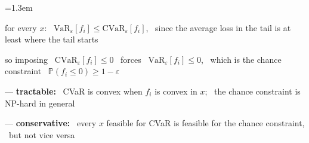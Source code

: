 \documentclass[10pt]{article}
\newenvironment{board}{%
  \par\vspace{4pt}
  \begingroup\leftskip=1.3em\relax\parskip=2pt\relax}{%
  \par\endgroup\vspace{4pt}}
\newcommand{\Prob}{\mathbb{P}}
\newcommand{\VaR}{\mathrm{VaR}}
\newcommand{\CVaR}{\mathrm{CVaR}}
\begin{document}
\begin{board}
\begin{center}
\end{center}
\vspace{2pt}

\quad for every $x$: \ $\VaR_{\varepsilon}[f_i] \le \CVaR_{\varepsilon}[f_i]$, \ since the average loss in the tail is at least where the tail starts
\vspace{3pt}

\quad so imposing \ $\CVaR_{\varepsilon}[f_i] \le 0$ \ forces \ $\VaR_{\varepsilon}[f_i] \le 0$, \ which is the chance constraint \ $\Prob(f_i \le 0) \ge 1 - \varepsilon$
\vspace{5pt}

\quad --- \textbf{tractable:} \ CVaR is convex when $f_i$ is convex in $x$; \ the chance constraint is NP-hard in general
\vspace{2pt}

\quad --- \textbf{conservative:} \ every $x$ feasible for CVaR is feasible for the chance constraint, \ but not vice versa
\end{board}

\newpage
\end{document}
